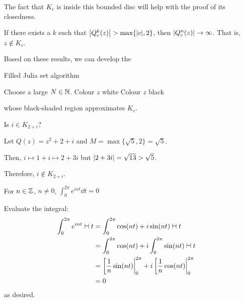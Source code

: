 \documentclass[class=pmath370,tikz,notes]{agony}
\begin{document}
\begin{remark}
  The fact that $K_c$ is inside this bounded disc will help with the proof of its closedness.
\end{remark}

\begin{corollary}
  If there exists a $k$ such that $\abs{Q_c^k(z)} > \max\{\abs{c}, 2\}$,
  then $\abs{Q_c^n(z)} \to \infty$.
  That is, $z \not\in K_c$.
\end{corollary}

Based on these results, we can develop the

\begin{algorithm}[H]
  \caption{Filled Julia set algorithm}
  \begin{algorithmic}[1]
    \State Choose a large $N \in \mathbb{N}$.
    \State Colour $z$ white
    \State Colour $z$ black
      \EndIf
      \EndFor
  \end{algorithmic}
\end{algorithm}

whose black-shaded region approximates $K_c$.

\begin{example}
  Is $i \in K_{2+i}$?
\end{example}
\begin{sol}
  Let $Q(z) = z^2 + 2 + i$ and $M = \max\{\sqrt5,2\} = \sqrt5$.

  Then, $i \mapsto 1 + i \mapsto 2 + 3i$ but $\abs{2+3i} = \sqrt{13} > \sqrt5$.

  Therefore, $i \not\in K_{2+i}$.
\end{sol}

\begin{remark}\label{rem:int}
  For $n \in \mathbb{Z}$, $n \neq 0$, $\int_0^{2\pi} e^{int} \dd{t} = 0$
\end{remark}
\begin{prf}
  Evaluate the integral:
  \begin{align*}
    \int_0^{2\pi} e^{int} \dd{t}
     & = \int_0^{2\pi} \cos(nt) + i\sin(nt) \dd{t}                          \\
     & = \int_0^{2\pi} \cos(nt) + i \int_0^{2\pi} \sin(nt) \dd{t}           \\
     & = \eval[\frac1n\sin(nt)|_0^{2\pi} + i\eval[\frac1n\cos(nt)|_0^{2\pi} \\
     & = 0
  \end{align*}
  as desired.
\end{prf}
\end{document}
